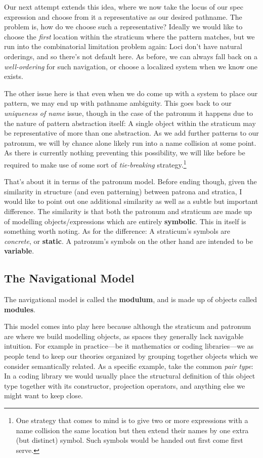 \documentclass[twoside]{article}
\newcommand{\strong}[1]{{\bfseries #1}}
\begin{document}
Our next attempt extends this idea, where we now take the locus of our spec expression and choose from it a representative
as our desired pathname. The problem is, how do we choose such a representative? Ideally we would like to choose the
\emph{first} location within the straticum where the pattern matches, but we run into the combinatorial limitation
problem again: Loci don't have natural orderings, and so there's not default here. As before, we can always fall
back on a \emph{well-ordering} for such navigation, or choose a localized system when we know one exists.

The other issue here is that even when we do come up with a system to place our pattern, we may end up with pathname ambiguity.
This goes back to our \emph{uniqueness of name} issue, though in the case of the patronum it happens due to the nature of pattern
abstraction itself: A single object within the straticum may be representative of more than one abstraction. As we add further
patterns to our patronum, we will by chance alone likely run into a name collision at some point. As there is currently nothing
preventing this possibility, we will like before be required to make use of some sort of \emph{tie-breaking} strategy.\footnote{One
strategy that comes to mind is to give two or more expressions with a name collision the same location but then extend their names
by one extra (but distinct) symbol. Such symbols would be handed out first come first serve.}

That's about it in terms of the patronum model. Before ending though, given the similarity in structure (and even patterning)
between patrona and stratica, I would like to point out one additional similarity as well as a subtle but important difference.
The similarity is that both the patronum and straticum are made up of modelling objects/expressions which are entirely
\strong{symbolic}. This in itself is something worth noting. As for the difference: A straticum's symbols are
\emph{concrete}, or \strong{static}. A patronum's symbols on the other hand are intended to be \strong{variable}.

\subsection*{The Navigational Model}

The navigational model is called the \strong{modulum}, and is made up of objects called \strong{modules}.

This model comes into play here because although the straticum and patronum are where we build modelling objects, as spaces
they generally lack navigable intuition. For example in practice---be it mathematics or coding libraries---we as people tend
to keep our theories organized by grouping together objects which we consider semantically related. As a specific example,
take the common \emph{pair type}: In a coding library we would usually place the structural definition of this object type
together with its constructor, projection operators, and anything else we might want to keep close.
\end{document}
